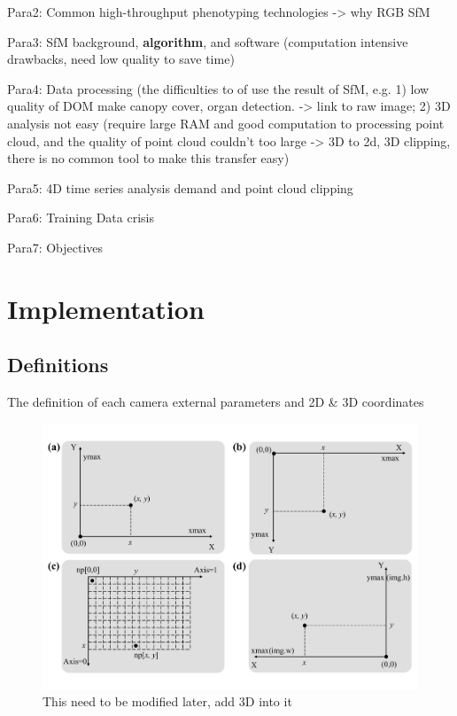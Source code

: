 \documentclass{configs/bmcart}
\begin{document}
Para2: Common high-throughput phenotyping technologies -> why RGB SfM

Para3: SfM background, \textbf{algorithm}, and software (computation intensive drawbacks, need low quality to save time)

Para4: Data processing (the difficulties to of use the result of SfM, e.g. 1) low quality of DOM make canopy cover, organ detection. -> link to raw image; 2) 3D analysis not easy (require large RAM and good computation to processing point cloud, and the quality of point cloud couldn't too large -> 3D to 2d, 3D clipping, there is no common tool to make this transfer easy)

Para5: 4D time series analysis demand and point cloud clipping

Para6: Training Data crisis

Para7: Objectives

\section*{Implementation}

\subsection*{Definitions}
The definition of each camera external parameters and 2D \& 3D coordinates

\begin{figure}[htbp]
\includegraphics[width=0.95\linewidth]{figures/coordinates.pdf}
\caption{
  This need to be modified later, add 3D into it}
\end{figure}
\end{document}
